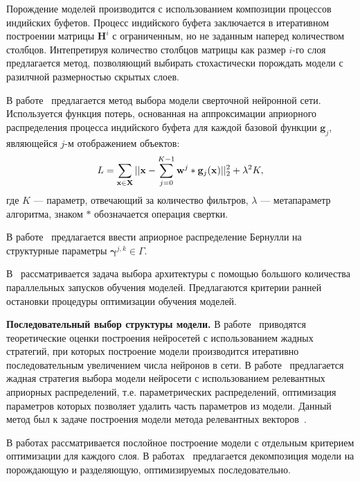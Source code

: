 Порождение моделей производится с использованием композиции процессов индийских буфетов. Процесс индийского буфета заключается в итеративном построении матрицы $\mathbf{H}^i$ с ограниченным, но не заданным наперед количеством столбцов. Интепретируя количество столбцов  матрицы как размер $i$-го слоя предлагается метод, позволяющий выбирать стохастически порождать модели с разилчной размерностью скрытых слоев. 

В работе~\cite{cib_simple} предлагается метод выбора модели сверточной нейронной сети. Используется функция потерь, основанная на аппроксимации априорного распределения процесса индийского буфета для каждой базовой функции $\mathbf{g}_j$, являющейся $j$-м отображением объектов:
\[
    L = \sum_{\mathbf{x} \in \mathbf{X}} ||\mathbf{x} - \sum_{j=0}^{K-1} \mathbf{w}^j * \mathbf{g}_j(\mathbf{x})||_2^2 + \lambda^2K,
\]
где $K$ --- параметр, отвечающий за количество фильтров, $\lambda$ --- метапараметр алгоритма, знаком $*$ обозначается операция свертки.

В работе~\cite{shirakawa2018dynamic} предлагается ввести априорное распределение Бернулли на структурные параметры $\boldsymbol{\gamma}^{j,k} \in \Gamma$.

В~\cite{optimal_racing} рассматривается задача выбора архитектуры с помощью большого количества параллельных запусков обучения моделей. Предлагаются критерии ранней остановки процедуры оптимизации обучения моделей.

\par{\textbf{Последовательный выбор структуры модели. }}
В работе~\cite{greed} приводятся теоретические оценки построения нейросетей с использованием жадных стратегий,  при которых построение модели производится итеративно последовательным увеличением числа нейронов в сети. В работе~\cite{greed_mlp} предлагается жадная стратегия выбора модели нейросети с использованием релевантных априорных распределений, т.е. параметрических распределений, оптимизация параметров которых позволяет удалить часть параметров из модели. Данный метод был к задаче построения модели метода релевантных векторов~\cite{rvm}. 

В работах\cite{Bengio, hd} рассматривается послойное построение модели с отдельным критерием оптимизации для каждого слоя. В работах~\cite{Kingma, gendis_pictures, gendis_phd} предлагается декомпозиция модели на порождающую и разделяющую, оптимизируемых последовательно. 

